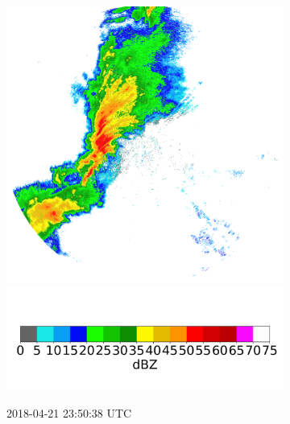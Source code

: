 \begin{figure}[ht]
	\centering
	\begin{subfigure}[b]{0.3\textwidth}
		\includegraphics[width=\textwidth]{./thesis_code/plots/midlothian.tx-20180421-235038-ref.png}
		\includegraphics[width=\textwidth]{./thesis_code/plots/dfw_colormap.png}
		\caption{2018-04-21 23:50:38 UTC}
		\label{fig:bestmodel_translation1}
	\end{subfigure}
	\begin{subfigure}[b]{0.3\textwidth}

\end{subfigure}
\end{figure}
